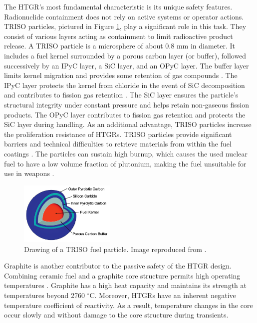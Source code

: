 The HTGR's most fundamental characteristic is its unique safety features.
Radionuclide containment does not rely on active systems or operator actions.
\gls{TRISO} particles, pictured in Figure \ref{fig:triso}, play a significant role in this task.
They consist of various layers acting as containment to limit radioactive product release.
A \gls{TRISO} particle is a microsphere of about 0.8 mm in diameter.
It includes a fuel kernel surrounded by a porous carbon layer (or buffer), followed successively by an \gls{IPyC} layer, a \gls{SiC} layer, and an \gls{OPyC} layer.
The buffer layer limits kernel migration and provides some retention of gas compounds \cite{oecd_nea_benchmark_2017}.
The \gls{IPyC} layer protects the kernel from chloride in the event of \gls{SiC} decomposition and contributes to fission gas retention \cite{demkowickz_paul_triso_2019}.
The \gls{SiC} layer ensures the particle's structural integrity under constant pressure and helps retain non-gaseous fission products.
The \gls{OPyC} layer contributes to fission gas retention and protects the \gls{SiC} layer during handling.
As an additional advantage, \gls{TRISO} particles increase the proliferation resistance of \glspl{HTGR}.
TRISO particles provide significant barriers and technical difficulties to retrieve materials from within the fuel coatings \cite{paviet-hartmann_analysis_2011}.
The particles can sustain high burnup, which causes the used nuclear fuel to have a low volume fraction of plutonium, making the fuel unsuitable for use in weapons \cite{paviet-hartmann_analysis_2011}.

\begin{figure}[htbp!]
	\centering
	\includegraphics[height=3.0cm]{figures/triso}
	\caption{Drawing of a TRISO fuel particle. Image reproduced from \cite{hales_multidimensional_2013}.}
	\label{fig:triso}
\end{figure}

Graphite is another contributor to the passive safety of the \gls{HTGR} design.
Combining ceramic fuel and a graphite core structure permits high operating temperatures \cite{ballinger_balance_2004}.
Graphite has a high heat capacity and maintains its strength at temperatures beyond 2760 $^{\circ}$C.
Moreover, HTGRs have an inherent negative temperature coefficient of reactivity.
As a result, temperature changes in the core occur slowly and without damage to the core structure during transients.

